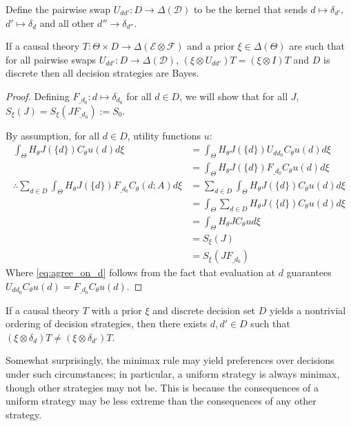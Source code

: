 Define the pairwise swap $U_{dd'}:D\to \Delta(\mathcal{D})$ to be the kernel that sends $d\mapsto \delta_{d'}$, $d'\mapsto \delta_d$ and all other $d''\to \delta_{d''}$.

\begin{theorem}\label{th:ncinco}
If a causal theory $T:\Theta\times D\to \Delta(\mathcal{E}\otimes\mathcal{F})$ and a prior $\xi\in \Delta(\Theta)$ are such that for all pairwise swaps $U_{dd'}:D\to \Delta(\mathcal{D})$, $(\xi\otimes U_{dd'})T = (\xi\otimes I)T$ and $D$ is discrete then all decision strategies are Bayes.
\end{theorem}

\begin{proof}
Defining $F_{\_d_0}:d\mapsto \delta_{d_0}$ for all $d\in D$, we will show that for all $J$, $S_\xi(J)=S_\xi(JF_{\_d_0}):=S_0$.

By assumption, for all $d\in D$, utility functions $u$:
\begin{align}
	\int_\Theta H_\theta J(\{d\}) C_\theta u(d) d\xi &= \int_\Theta H_\theta J(\{d\}) U_{dd_0} C_\theta u(d) d\xi\\
													 &= \int_\Theta H_\theta J(\{d\}) F_{\_d_0} C_\theta u(d) d\xi\label{eq:agree_on_d}\\
\therefore \sum_{d\in D} \int_\Theta H_\theta J(\{d\}) F_{\_d_0} C_\theta(d;A) d\xi &= \sum_{d\in D} \int_\Theta H_\theta J(\{d\}) C_\theta u(d) d\xi\\
													 &= \int_\Theta \sum_{d\in D} H_\theta J(\{d\}) C_\theta u (d) d\xi\\
													 &= \int_\Theta H_\theta J C_\theta u d\xi\\
													 &= S_\xi(J)\\
													 &= S_\xi(JF_{\_d_0})
\end{align}
Where \ref{eq:agree_on_d} follows from the fact that evaluation at $d$ guarantees $U_{dd_0} C_\theta u(d) = F_{\_d_0} C_\theta u(d)$.
\end{proof}

\begin{corollary}
If a causal theory $T$ with a prior $\xi$ and discrete decision set $D$ yields a nontrivial ordering of decision strategies, then there exists $d,d'\in D$ such that $(\xi\otimes \delta_d) T\neq (\xi\otimes \delta_{d'}) T$.
\end{corollary}

Somewhat surprisingly, the minimax rule may yield preferences over decisions under such circumstances; in particular, a uniform strategy is always minimax, though other strategies may not be. This is because the consequences of a uniform strategy may be less extreme than the consequences of any other strategy.

